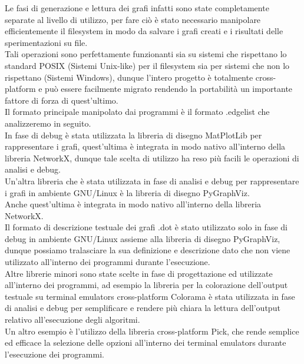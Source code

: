 Le fasi di generazione e lettura dei grafi infatti sono state completamente separate al livello di utilizzo, per fare ciò è stato necessario manipolare efficientemente il filesystem in modo da salvare i grafi creati e i risultati delle sperimentazioni su file.\\

Tali operazioni sono perfettamente funzionanti sia su sistemi che rispettano lo standard POSIX (Sistemi Unix-like) per il filesystem sia per sistemi che non lo rispettano (Sistemi Windows), dunque l'intero progetto è totalmente cross-platform e può essere facilmente migrato rendendo la portabilità un importante fattore di forza di quest'ultimo.\\

Il formato principale manipolato dai programmi è il formato .edgelist che analizzeremo in seguito.\\

In fase di debug è stata utilizzata la libreria di disegno MatPlotLib per rappresentare i grafi, quest'ultima è integrata in modo nativo all'interno della libreria NetworkX, dunque tale scelta di utilizzo ha reso più facili le operazioni di analisi e debug.\\

Un'altra libreria che è stata utilizzata in fase di analisi e debug per rappresentare i grafi in ambiente GNU/Linux è la libreria di disegno PyGraphViz.\\

Anche quest'ultima è integrata in modo nativo all'interno della libreria NetworkX.\\

Il formato di descrizione testuale dei grafi .dot è stato utilizzato solo in fase di debug in ambiente GNU/Linux assieme alla libreria di disegno PyGraphViz, dunque possiamo tralasciare la sua definizione e descrizione dato che non viene utilizzato all'interno dei programmi durante l'esecuzione.\\

Altre librerie minori sono state scelte in fase di progettazione ed utilizzate all'interno dei programmi, ad esempio la libreria per la colorazione dell'output testuale su terminal emulators cross-platform Colorama è stata utilizzata in fase di analisi e debug per semplificare e rendere più chiara la lettura dell'output relativo all'esecuzione degli algoritmi.\\

Un altro esempio è l'utilizzo della libreria cross-platform Pick, che rende semplice ed efficace la selezione delle opzioni all'interno dei terminal emulators durante l'esecuzione dei programmi.\\

